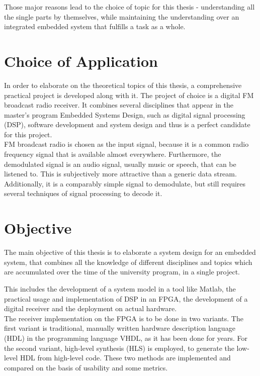 Those major reasons lead to the choice of topic for this thesis - understanding all the single parts by themselves, while maintaining the understanding over an integrated embedded system that fulfills a task as a whole.

\section{Choice of Application}

In order to elaborate on the theoretical topics of this thesis, a comprehensive practical project is developed along with it.
The project of choice is a digital FM broadcast radio receiver.
It combines several disciplines that appear in the master's program Embedded Systems Design, such as digital signal processing (DSP), software development and system design and thus is a perfect candidate for this project.\\

FM broadcast radio is chosen as the input signal, because it is a common radio frequency signal that is available almost everywhere.
Furthermore, the demodulated signal is an audio signal, usually music or speech, that can be listened to.
This is subjectively more attractive than a generic data stream.
Additionally, it is a comparably simple signal to demodulate, but still requires several techniques of signal processing to decode it.

\section{Objective}

The main objective of this thesis is to elaborate a system design for an embedded system, that combines all the knowledge of different disciplines and topics which are accumulated over the time of the university program, in a single project.

This includes the development of a system model in a tool like Matlab, the practical usage and implementation of DSP in an FPGA, the development of a digital receiver and the deployment on actual hardware.\\

The receiver implementation on the FPGA is to be done in two variants.
The first variant is traditional, manually written hardware description language (HDL) in the programming language VHDL, as it has been done for years.
For the second variant, high-level synthesis (HLS) is employed, to generate the low-level HDL from high-level \cplusplus code.
These two methods are implemented and compared on the basis of usability and some metrics.

